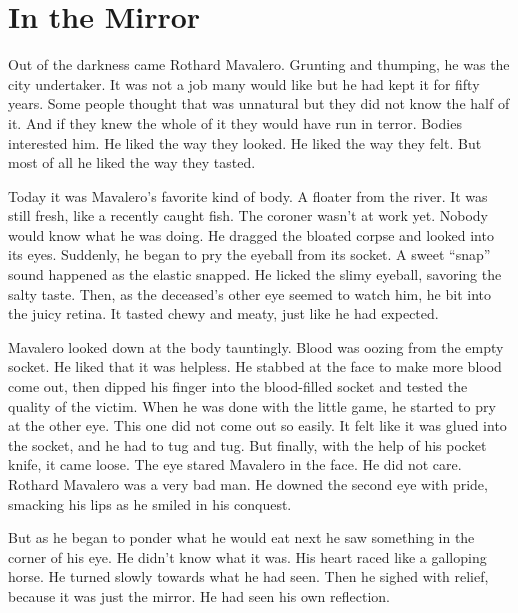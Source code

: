 \chapter{In the Mirror}
%
%


Out of the darkness came Rothard Mavalero. Grunting and thumping,
he was the city undertaker. It was not a job many would like but he
had kept it for fifty years. Some people thought that was unnatural
but they did not know the half of it. And if they knew the whole of
it they would have run in terror. Bodies interested him. He liked
the way they looked. He liked the way they felt. But most of all he
liked the way they tasted.



Today it was Mavalero's favorite kind of body. A floater from the
river. It was still fresh, like a recently caught fish. The coroner
wasn't at work yet. Nobody would know what he was doing. He dragged
the bloated corpse and looked into its eyes. Suddenly, he began to
pry the eyeball from its socket. A sweet ``snap'' sound happened as
the elastic snapped. He licked the slimy eyeball, savoring the
salty taste. Then, as the deceased's other eye seemed to watch him,
he bit into the juicy retina. It tasted chewy and meaty, just like
he had expected.



Mavalero looked down at the body tauntingly. Blood was oozing from
the empty socket. He liked that it was helpless. He stabbed at the
face to make more blood come out, then dipped his finger into the
blood-filled socket and tested the quality of the victim. When he
was done with the little game, he started to pry at the other eye.
This one did not come out so easily. It felt like it was glued into
the socket, and he had to tug and tug. But finally, with the help
of his pocket knife, it came loose. The eye stared Mavalero in the
face. He did not care. Rothard Mavalero was a very bad man. He
downed the second eye with pride, smacking his lips as he smiled in
his conquest.



But as he began to ponder what he would eat next he saw something
in the corner of his eye. He didn't know what it was. His heart
raced like a galloping horse. He turned slowly towards what he had
seen. Then he sighed with relief, because it was just the mirror.
He had seen his own reflection.



